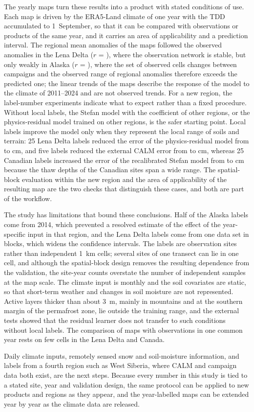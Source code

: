 The yearly maps turn these results into a product with stated conditions of use. Each map is driven by the ERA5-Land climate of one year with the TDD accumulated to 1~September, so that it can be compared with observations or products of the same year, and it carries an area of applicability and a prediction interval. The regional mean anomalies of the maps followed the observed anomalies in the Lena Delta ($r$ = \nanobsrLe), where the observation network is stable, but only weakly in Alaska ($r$ = \nanobsrAk), where the set of observed cells changes between campaigns and the observed range of regional anomalies therefore exceeds the predicted one; the linear trends of the maps describe the response of the model to the climate of 2011--2024 and are not observed trends. For a new region, the label-number experiments indicate what to expect rather than a fixed procedure. Without local labels, the Stefan model with the coefficient of other regions, or the physics-residual model trained on other regions, is the safer starting point. Local labels improve the model only when they represent the local range of soils and terrain: 25 Lena Delta labels reduced the error of the physics-residual model from \ntlrmseLeRszero{} to \ntlrmseLeRstwfive{} cm, and five labels reduced the external CALM error from \nftAllRszero{} to \nftAllRsfive{} cm, whereas 25 Canadian labels increased the error of the recalibrated Stefan model from \ntlrmseCaPzzero{} to \ntlrmseCaPntwfive{} cm because the thaw depths of the Canadian sites span a wide range. The spatial-block evaluation within the new region and the area of applicability of the resulting map are the two checks that distinguish these cases, and both are part of the workflow.

The study has limitations that bound these conclusions. Half of the Alaska labels come from 2014, which prevented a resolved estimate of the effect of the year-specific input in that region, and the Lena Delta labels come from one data set in \nnblkLe{} blocks, which widens the confidence intervals. The labels are observation sites rather than independent 1~km cells; several sites of one transect can lie in one cell, and although the spatial-block design removes the resulting dependence from the validation, the site-year counts overstate the number of independent samples at the map scale. The climate input is monthly and the soil covariates are static, so that short-term weather and changes in soil moisture are not represented. Active layers thicker than about 3~m, mainly in mountains and at the southern margin of the permafrost zone, lie outside the training range, and the external tests showed that the residual learner does not transfer to such conditions without local labels. The comparison of maps with observations in one common year rests on few cells in the Lena Delta and Canada.

Daily climate inputs, remotely sensed snow and soil-moisture information, and labels from a fourth region such as West Siberia, where CALM and campaign data both exist, are the next steps. Because every number in this study is tied to a stated site, year and validation design, the same protocol can be applied to new products and regions as they appear, and the year-labelled maps can be extended year by year as the climate data are released.
